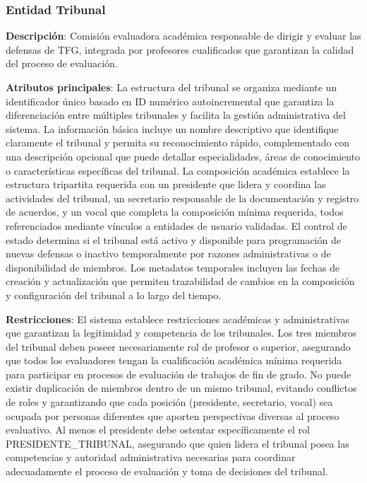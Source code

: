 \documentclass[12pt,a4paper,oneside]{report}
\begin{document}
\subsubsection{Entidad Tribunal}\label{entidad-tribunal}

\textbf{Descripción}: Comisión evaluadora académica responsable de dirigir y evaluar las defensas de TFG, integrada por profesores cualificados que garantizan la calidad del proceso de evaluación.

\textbf{Atributos principales}: La estructura del tribunal se organiza mediante un identificador único basado en ID numérico autoincremental que garantiza la diferenciación entre múltiples tribunales y facilita la gestión administrativa del sistema. La información básica incluye un nombre descriptivo que identifique claramente el tribunal y permita su reconocimiento rápido, complementado con una descripción opcional que puede detallar especialidades, áreas de conocimiento o características específicas del tribunal. La composición académica establece la estructura tripartita requerida con un presidente que lidera y coordina las actividades del tribunal, un secretario responsable de la documentación y registro de acuerdos, y un vocal que completa la composición mínima requerida, todos referenciados mediante vínculos a entidades de usuario validadas. El control de estado determina si el tribunal está activo y disponible para programación de nuevas defensas o inactivo temporalmente por razones administrativas o de disponibilidad de miembros. Los metadatos temporales incluyen las fechas de creación y actualización que permiten trazabilidad de cambios en la composición y configuración del tribunal a lo largo del tiempo.

\textbf{Restricciones}: El sistema establece restricciones académicas y administrativas que garantizan la legitimidad y competencia de los tribunales. Los tres miembros del tribunal deben poseer necesariamente rol de profesor o superior, asegurando que todos los evaluadores tengan la cualificación académica mínima requerida para participar en procesos de evaluación de trabajos de fin de grado. No puede existir duplicación de miembros dentro de un mismo tribunal, evitando conflictos de roles y garantizando que cada posición (presidente, secretario, vocal) sea ocupada por personas diferentes que aporten perspectivas diversas al proceso evaluativo. Al menos el presidente debe ostentar específicamente el rol PRESIDENTE\_TRIBUNAL, asegurando que quien lidera el tribunal posea las competencias y autoridad administrativa necesarias para coordinar adecuadamente el proceso de evaluación y toma de decisiones del tribunal.
\end{document}
